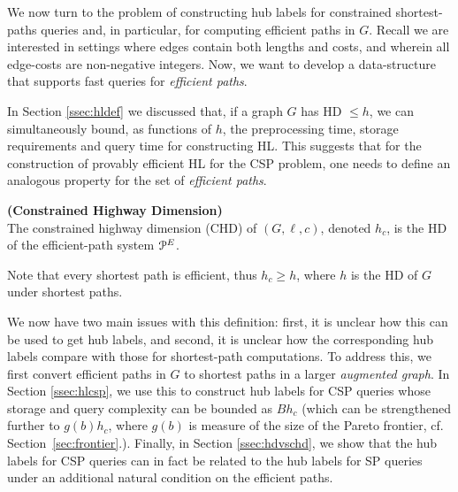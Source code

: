 We now turn to the problem of constructing hub labels for constrained shortest-paths queries and, in particular, for computing efficient paths in $G$. 
Recall we are interested in settings where edges contain both lengths and costs, and wherein all edge-costs are non-negative integers.
Now, we want to develop a data-structure that supports fast queries for \emph{efficient paths}. 

In Section \ref{ssec:hldef} we discussed that, if a graph $G$ has HD $\leq h$, we can simultaneously bound, as functions of $h$, the preprocessing time, storage requirements and query time for constructing HL.
This suggests that for the construction of provably efficient HL for the CSP problem, one needs to define an analogous property for the set of \emph{efficient paths}.
\begin{definition}
\textbf{(Constrained Highway Dimension)}\\ The constrained highway dimension (CHD) of $(G,\ell,c)$, denoted $h_c$, is the HD of the efficient-path system $\mathcal{P}^E$.
\end{definition}
Note that every shortest path is efficient, thus $h_c\geq h$, where $h$ is the HD of $G$ under shortest paths.

We now have two main issues with this definition: first, it is unclear how this can be used to get hub labels, and second, it is unclear how the corresponding hub labels compare with those for shortest-path computations. To address this, we first convert efficient paths in $G$ to shortest paths in a larger \emph{augmented graph}. In Section \ref{ssec:hlcsp}, we use this to construct hub labels for CSP queries whose storage and query complexity can be bounded as $Bh_c$ (which can be strengthened further to $g(b)h_c$, where $g(b)$ is measure of the size of the Pareto frontier, cf. Section~\ref{sec:frontier}.). Finally, in Section \ref{ssec:hdvschd}, we show that the hub labels for CSP queries can in fact be related to the hub labels for SP queries under an additional natural condition on the efficient paths.